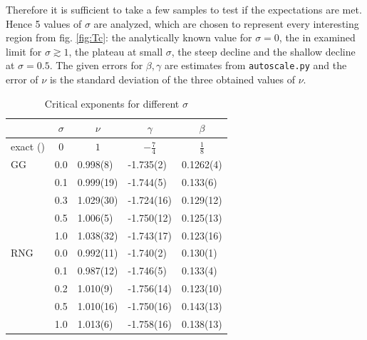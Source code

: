     Therefore it is sufficient to take a few samples to test if the
    expectations are met. Hence 5 values of \(\sigma\) are analyzed,
    which are chosen to represent every interesting region from fig. \ref{fig:Tc}:
    the analytically known value for \(\sigma = 0\), the in \cite{Janke1994}
    examined limit for \(\sigma \gtrsim 1\), the plateau at small
    \(\sigma\), the steep decline and the shallow decline at \(\sigma = 0.5\).
    The given errors for \(\beta, \gamma\) are estimates from \texttt{autoscale.py}
    and the error of \(\nu\) is the standard deviation of the three obtained
    values of \(\nu\).\\
    \begin{table}[htbp]
        \center
        \begin{tabular}{l l l l l}
            \toprule
             & \multicolumn{1}{c}{\(\sigma\)} & \multicolumn{1}{c}{\(\nu\)} & \multicolumn{1}{c}{\(\gamma\)} & \multicolumn{1}{c}{\(\beta\)}\\
            \midrule
            exact (\cite[p. 59]{Pelissetto2002}) & \multicolumn{1}{c}{\(0\)} & \multicolumn{1}{c}{\(1\)} & \multicolumn{1}{c}{\(-\frac{7}{4}\)} & \multicolumn{1}{c}{\(\frac{1}{8}\)}\\
            \midrule
            GG           & 0.0 & 0.998(8) & -1.735(2) & 0.1262(4)\\
                         & 0.1 & 0.999(19)& -1.744(5) & 0.133(6) \\
                         & 0.3 & 1.029(30)& -1.724(16)& 0.129(12)\\
                         & 0.5 & 1.006(5) & -1.750(12)& 0.125(13)\\
                         & 1.0 & 1.038(32)& -1.743(17)& 0.123(16)\\
            \midrule
            RNG          & 0.0 & 0.992(11)& -1.740(2) & 0.130(1) \\
                         & 0.1 & 0.987(12)& -1.746(5) & 0.133(4) \\
                         & 0.2 & 1.010(9) & -1.756(14)& 0.123(10)\\
                         & 0.5 & 1.010(16)& -1.750(16)& 0.143(13)\\
                         & 1.0 & 1.013(6) & -1.758(16)& 0.138(13)\\
            \bottomrule
        \end{tabular}
        \caption{Critical exponents for different $\sigma$}
        \label{tab:critExp}
    \end{table}\\
